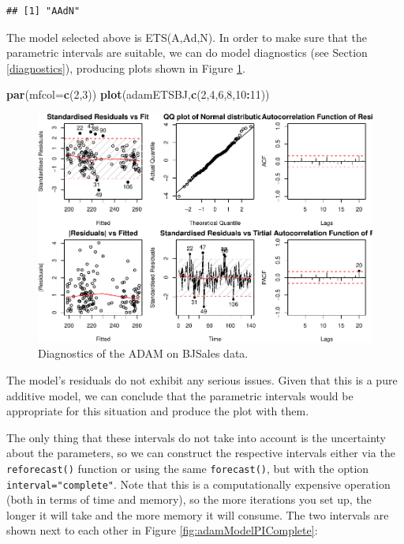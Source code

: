 \documentclass[]{book}
\newenvironment{Shaded}{\begin{snugshade}}{\end{snugshade}}
\newcommand{\DataTypeTok}[1]{\textcolor[rgb]{0.13,0.29,0.53}{#1}}
\newcommand{\DecValTok}[1]{\textcolor[rgb]{0.00,0.00,0.81}{#1}}
\newcommand{\KeywordTok}[1]{\textcolor[rgb]{0.13,0.29,0.53}{\textbf{#1}}}
\newcommand{\NormalTok}[1]{#1}
\newcommand{\OperatorTok}[1]{\textcolor[rgb]{0.81,0.36,0.00}{\textbf{#1}}}
\theoremstyle{definition}
\theoremstyle{definition}
\theoremstyle{definition}
\theoremstyle{definition}
\theoremstyle{remark}
\begin{document}
\begin{verbatim}
## [1] "AAdN"
\end{verbatim}

The model selected above is ETS(A,Ad,N). In order to make sure that the parametric intervals are suitable, we can do model diagnostics (see Section \ref{diagnostics}), producing plots shown in Figure \ref{fig:adamModelDiagnostics}.

\begin{Shaded}
\begin{Highlighting}[]
\KeywordTok{par}\NormalTok{(}\DataTypeTok{mfcol=}\KeywordTok{c}\NormalTok{(}\DecValTok{2}\NormalTok{,}\DecValTok{3}\NormalTok{))}
\KeywordTok{plot}\NormalTok{(adamETSBJ,}\KeywordTok{c}\NormalTok{(}\DecValTok{2}\NormalTok{,}\DecValTok{4}\NormalTok{,}\DecValTok{6}\NormalTok{,}\DecValTok{8}\NormalTok{,}\DecValTok{10}\OperatorTok{:}\DecValTok{11}\NormalTok{))}
\end{Highlighting}
\end{Shaded}

\begin{figure}
\centering
\includegraphics{Svetunkov--2022----ADAM_files/figure-latex/adamModelDiagnostics-1.pdf}
\caption{\label{fig:adamModelDiagnostics}Diagnostics of the ADAM on BJSales data.}
\end{figure}

The model's residuals do not exhibit any serious issues. Given that this is a pure additive model, we can conclude that the parametric intervals would be appropriate for this situation and produce the plot with them.

The only thing that these intervals do not take into account is the uncertainty about the parameters, so we can construct the respective intervals either via the \texttt{reforecast()} function or using the same \texttt{forecast()}, but with the option \texttt{interval="complete"}. Note that this is a computationally expensive operation (both in terms of time and memory), so the more iterations you set up, the longer it will take and the more memory it will consume. The two intervals are shown next to each other in Figure \ref{fig:adamModelPIComplete}:
\end{document}
